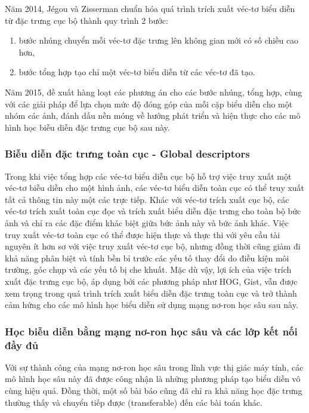 Năm 2014, Jégou và Zisserman chuẩn hóa quá trình trích xuất véc-tơ biểu diễn từ đặc trưng cục bộ thành quy trình 2 bước\cite{Jegou_2014_CVPR}:

\begin{enumerate}
    \item bước nhúng chuyển mỗi véc-tơ đặc trưng lên không gian mới có số chiều cao hơn,
    \item bước tổng hợp tạo chỉ một véc-tơ biểu diễn từ các véc-tơ đã tạo.
\end{enumerate}

Năm 2015, \cite{selective-match-kernel} đề xuất hàng loạt các phương án cho các bước nhúng, tổng hợp, cùng với các giải pháp để lựa chọn mức độ đóng góp của mỗi cặp biểu diễn cho một nhóm các ảnh, đánh dấu nền móng về hướng phát triển và hiện thực cho các mô hình học biễu diễn đặc trưng cục bộ sau này.

\subsubsection{Biễu diễn đặc trưng toàn cục  - Global descriptors}

Trong khi việc tổng hợp các véc-tơ biểu diễn cục bộ hỗ trợ việc truy xuất một véc-tơ biễu diễn cho một hình ảnh, các véc-tơ biểu diễn toàn cục có thể truy xuất tất cả thông tin này một các trực tiếp. Khác với véc-tơ trích xuất cục bộ, các véc-tơ trích xuất toàn cục đọc và trích xuất biểu diễn đặc trưng cho toàn bộ bức ảnh và chỉ ra các đặc điểm khác biệt giữa bức ảnh này và bức ảnh khác. Việc truy xuất véc-tơ toàn cục có thể được hiện thực và thực thi với yêu cầu tài nguyên ít hơn sơ với việc truy xuất véc-tơ cục bộ, nhưng đồng thời cũng giảm đi khả năng phân biệt và tính bền bỉ trước các yếu tố thay đổi do điều kiện môi trường, góc chụp và các yếu tố bị che khuất. Mặc dù vậy, lợi ích của việc trích xuất đặc trưng cục bộ, áp dụng bởi các phương pháp như HOG\cite{HOG}, Gist\cite{GIST}, vẫn được xem trọng trong quá trình trích xuất biểu diễn đặc trưng toàn cục và trở thành cảm hứng cho các mô hình học biểu diễn sử dụng mạng nơ-ron học sâu sau này.

\subsubsection{Học biễu diễn bằng mạng nơ-ron học sâu và các lớp kết nối đầy đủ}

Với sự thành công của mạng nơ-ron học sâu trong lĩnh vực thị giác máy tính\cite{krizhevsky2012imagenet}, các mô hình học sâu này đã được công nhận là những phương pháp tạo biểu diễn vô cùng hiệu quả. Đồng thời, một số bài báo cũng đã chỉ ra khả năng học đặc trưng thường thấy và chuyển tiếp được (transferable) đến các bài toán khác\cite{Oquab_2014_CVPR,ZeilerVisualizingAU,Chen2018DeepLabSI}.

